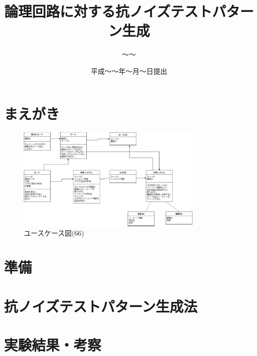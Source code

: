 

\newenvironment{indention}[1]{\par
\addtolength{\leftskip}{#1}
\begingroup}{\endgroup\par}

\title{論理回路に対する抗ノイズテストパターン生成}
\author{～～}
\date{平成～～年～月～日提出}


\maketitle
\tableofcontents
\cleardoublepage
{}

\chapter{まえがき}

\begin{figure}[htbp]
\centering
\includegraphics[width = 9cm]{class_ic.eps}
\caption{ユースケース図(66)}
\label{usecase1}
\end{figure}



\chapter{準備}


\chapter{抗ノイズテストパターン生成法}


\chapter{実験結果・考察}


